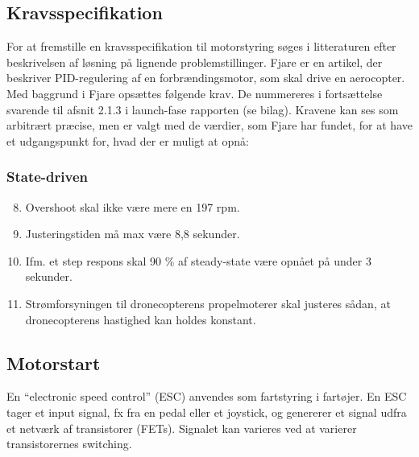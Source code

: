 
\subsection{Kravsspecifikation}
\label{sec:kravsspecifikation}
For at fremstille en kravsspecifikation til motorstyring søges i litteraturen efter beskrivelsen af løsning på lignende problemstillinger. Fjare\autocite{pid1} er en artikel, der beskriver PID-regulering af en forbrændingsmotor, som skal drive en aerocopter. Med baggrund i Fjare\autocite{pid1} opsættes følgende krav. De nummereres i fortsættelse svarende til afsnit 2.1.3  i launch-fase rapporten (se bilag). Kravene kan ses som arbitrært præcise, men er valgt med de værdier, som Fjare\autocite{pid1} har fundet, for at have et udgangspunkt for, hvad der er muligt at opnå:

\subsubsection{State-driven}
\label{sec:state-driven-1}

\begin{enumerate}[label=2.1.3.\arabic*]
  \setcounter{enumi}{7}
\item Overshoot skal ikke være mere en 197 rpm.
\item Justeringstiden må max være 8,8 sekunder.
\item Ifm. et step respons skal 90 \% af steady-state være opnået på under 3 sekunder.
\item Strømforsyningen til dronecopterens propelmoterer skal justeres sådan, at dronecopterens hastighed kan holdes konstant.%
\end{enumerate}

\subsection{Motorstart}
\label{sec:esc}

En ``electronic speed control'' (ESC) anvendes som fartstyring i fartøjer. En ESC tager et input signal, fx fra en pedal eller et joystick, og genererer et signal udfra et netværk af transistorer (FETs). Signalet kan varieres ved at varierer transistorernes switching.

